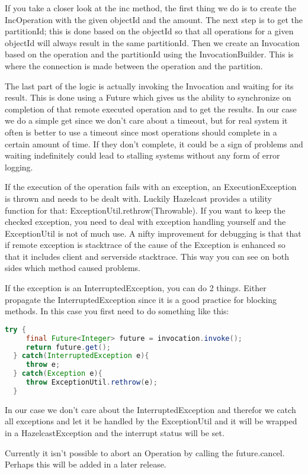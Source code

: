 If you take a closer look at the inc method, the first thing we do is to create the IncOperation with the given objectId and the amount. The next step is to get the partitionId; this is done based on the objectId so that all operations for a given objectId will always result in the same partitionId. Then we create an Invocation based on the operation and the partitionId using the InvocationBuilder. This is where the connection is made between the operation and the partition. 

The last part of the logic is actually invoking the Invocation and waiting for its result. This is done using a Future which gives us the ability to synchronize on completion of that remote executed operation and to get the results. In our case we do a simple get since we don't care about a timeout, but for real system it often is better to use a timeout since most operations should complete in a certain amount of time. If they don't complete, it could be a sign of problems and waiting indefinitely could lead to stalling systems without any form of error logging.

If the execution of the operation fails with an exception, an ExecutionException is thrown and needs to be dealt with. Luckily Hazelcast provides a utility function for that: ExceptionUtil.rethrow(Throwable). If you want to keep the checked exception, you need to deal with exception handling yourself and the ExceptionUtil  is not of much use. 
A nifty improvement for debugging is that that if remote exception is  stacktrace of the cause of the Exception is enhanced so that it includes client and serverside stacktrace. This way you can see on both sides which method caused problems.

If the exception is an InterruptedException, you can do 2 things. Either propagate the InterruptedException since it is a good practice for blocking methods. In this case you first need to do something like this:
\begin{lstlisting}[language=java]
  try {
     final Future<Integer> future = invocation.invoke();
     return future.get();
  } catch(InterruptedException e){
     throw e;
  } catch(Exception e){
     throw ExceptionUtil.rethrow(e);
  }
\end{lstlisting}
In our case we don't care about the InterruptedException and therefor we catch all exceptions and let it be handled by the ExceptionUtil and it will be wrapped in a HazelcastException and the interrupt status will be set.

Currently it isn't possible to abort an Operation by calling the future.cancel. Perhaps this will be added in a later release.

